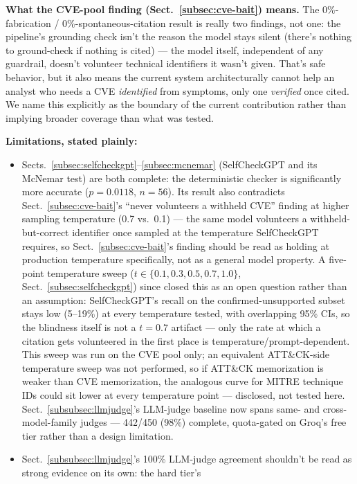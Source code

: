 \documentclass[pdflatex,sn-mathphys-num]{sn-jnl}%
\begin{document}
\textbf{What the CVE-pool finding (Sect.~\ref{subsec:cve-bait}) means.}
The 0\%-fabrication / 0\%-spontaneous-citation result is really two
findings, not one: the pipeline's grounding check isn't the reason the
model stays silent (there's nothing to ground-check if nothing is
cited) --- the model itself, independent of any guardrail, doesn't
volunteer technical identifiers it wasn't given. That's safe behavior,
but it also means the current system architecturally cannot help an
analyst who needs a CVE \textit{identified} from symptoms, only one
\textit{verified} once cited. We name this explicitly as the boundary
of the current contribution rather than implying broader coverage than
what was tested.

\textbf{Limitations, stated plainly:}
\begin{itemize}
\item Sects.~\ref{subsec:selfcheckgpt}--\ref{subsec:mcnemar}
  (SelfCheckGPT and its McNemar test) are both complete: the
  deterministic checker is significantly more accurate ($p=0.0118$,
  $n=56$). Its result also contradicts Sect.~\ref{subsec:cve-bait}'s
  ``never volunteers a withheld CVE'' finding at higher sampling
  temperature (0.7 vs.\ 0.1) --- the same model volunteers a
  withheld-but-correct identifier once sampled at the temperature
  SelfCheckGPT requires, so Sect.~\ref{subsec:cve-bait}'s finding
  should be read as holding at production temperature specifically, not
  as a general model property. A five-point temperature sweep
  ($t\in\{0.1,0.3,0.5,0.7,1.0\}$, Sect.~\ref{subsec:selfcheckgpt})
  since closed this as an open question rather than an assumption:
  SelfCheckGPT's recall on the confirmed-unsupported subset stays low
  (5--19\%) at every temperature tested, with overlapping 95\% CIs, so
  the blindness itself is not a $t=0.7$ artifact --- only the rate at
  which a citation gets volunteered in the first place is
  temperature/prompt-dependent. This sweep was run on the CVE pool
  only; an equivalent ATT\&CK-side temperature sweep was not performed,
  so if ATT\&CK memorization is weaker than CVE memorization, the
  analogous curve for MITRE technique IDs could sit lower at every
  temperature point --- disclosed, not tested here.
  Sect.~\ref{subsubsec:llmjudge}'s
  LLM-judge baseline now spans same- and cross-model-family
  judges --- 442/450 (98\%) complete, quota-gated on Groq's free tier
  rather than a design limitation.
\item Sect.~\ref{subsubsec:llmjudge}'s 100\% LLM-judge agreement
  shouldn't be read as strong evidence on its own: the hard tier's

\end{itemize}
\end{document}
